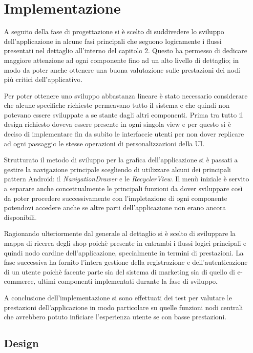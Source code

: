 \section{Implementazione}
A seguito della fase di progettazione si è scelto di suddivedere lo sviluppo dell'applicazione in alcune fasi principali che seguono logicamente i flussi presentati nel dettaglio all'interno del capitolo 2.
Questo ha permesso di dedicare maggiore attenzione ad ogni componente fino ad un alto livello di dettaglio; in modo da poter anche ottenere una buona valutazione sulle prestazioni dei nodi più critici dell'applicativo.

Per poter ottenere uno sviluppo abbastanza lineare è stato necessario considerare che alcune specifiche richieste permeavano tutto il sistema e che quindi non potevano essere sviluppate a se stante dagli altri componenti.
Prima tra tutto il design richiesto doveva essere presente in ogni singola view e per questo si è deciso di implementare fin da subito le interfaccie utenti per non dover replicare ad ogni passaggio le stesse operazioni di personalizzazioni della UI.

Strutturato il metodo di sviluppo per la grafica dell'applicazione si è passati a gestire la navigazione principale scegliendo di utilizzare alcuni dei principali pattern Android: il \textit{NavigationDrawer} e le \textit{RecyclerView}.
Il menù iniziale è servito a separare anche concettualmente le principali funzioni da dover sviluppare così da poter procedere successivamente con l'impletazione di ogni componente potendovi accedere anche se altre parti dell'applicazione non erano ancora disponibili.

Ragionando ulteriormente dal generale al dettaglio si è scelto di sviluppare la mappa di ricerca degli shop poichè presente in entrambi i flussi logici principali e quindi nodo cardine dell'applicazione, specialmente in termini di prestazioni.
La fase successiva ha fornito l'intera gestione della registrazione e dell'autenticazione di un utente poichè facente parte sia del sistema di marketing sia di quello di e-commerce, ultimi componenti implementati durante la fase di sviluppo.

A conclusione dell'implementazione si sono effettuati dei test per valutare le prestazioni dell'applicazione in modo particolare su quelle funzioni nodi centrali che avrebbero potuto inficiare l'esperienza utente se con basse prestazioni.


\subsection{Design}

